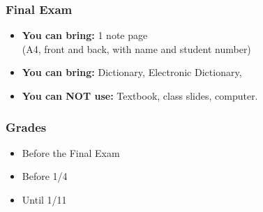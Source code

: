 \documentclass{beamer}
\begin{document}
\begin{frame}
  \frametitle{Final Exam}

  \begin{itemize}
  \item {\bf You can bring:} 1 note page\\
    \hfill(A4, front and back, with name and student number)
    \bigskip
    
  \item {\bf You can bring:} Dictionary, Electronic Dictionary,
    \bigskip
    
  \item \alert{{\bf You can NOT use:}} Textbook, class slides,
    computer.
  \end{itemize}
\end{frame}

\begin{frame}
  \frametitle{Grades}
  \begin{itemize}
  \item {} Before the Final Exam
    \bigskip
    
  \item {} Before 1/4
    \bigskip
    
  \item {} Until 1/11
  \end{itemize}
\end{frame}
\end{document}
